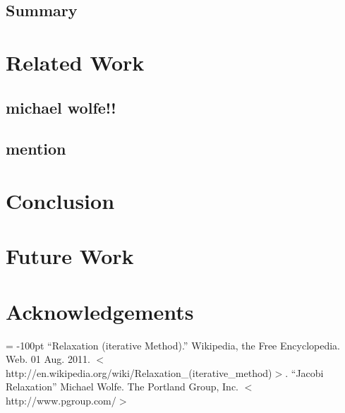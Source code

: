 \documentclass[10pt, twocolumn]{article}
\begin{document}
\subsection{Summary} %

\section{Related Work} %
    \subsection{michael wolfe!!}
    \subsection{mention} %

\section{Conclusion} %

\section{Future Work} %
\section{Acknowledgements} %

\begin{flushleft}
\begin{thebibliography}{99}
\topmargin = -100pt
    ``Relaxation (iterative Method).''
        Wikipedia, the Free Encyclopedia. Web. 01 Aug. 2011. $<$http://en.wikipedia.org/wiki/Relaxation\_(iterative\_method)$>$.
    ``Jacobi Relaxation''
        Michael Wolfe. The Portland Group, Inc. $<$http://www.pgroup.com/$>$
\end{thebibliography}
\end{flushleft}
\end{document}
